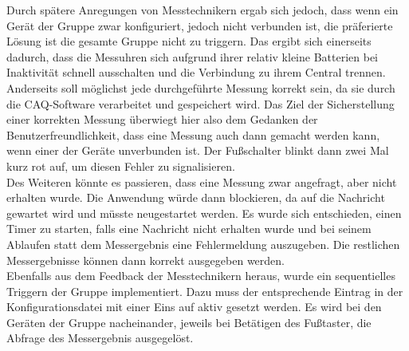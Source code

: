 Durch spätere Anregungen von Messtechnikern ergab sich jedoch, dass wenn ein Gerät der Gruppe zwar konfiguriert, jedoch nicht verbunden ist, die präferierte Lösung ist die gesamte Gruppe nicht zu triggern. Das ergibt sich einerseits dadurch, dass die Messuhren sich aufgrund ihrer relativ kleine Batterien bei Inaktivität schnell ausschalten und die Verbindung zu ihrem Central trennen. Anderseits soll möglichst jede durchgeführte Messung korrekt sein, da sie durch die \ac{CAQ}-Software verarbeitet und gespeichert wird. Das Ziel der Sicherstellung einer korrekten Messung überwiegt hier also dem Gedanken der Benutzerfreundlichkeit, dass eine Messung auch dann gemacht werden kann, wenn einer der Geräte unverbunden ist. Der Fußschalter blinkt dann zwei Mal kurz rot auf, um diesen Fehler zu signalisieren.\\
Des Weiteren könnte es passieren, dass eine Messung zwar angefragt, aber nicht erhalten wurde. Die Anwendung würde dann blockieren, da auf die Nachricht gewartet wird und müsste neugestartet werden. Es wurde sich entschieden, einen Timer zu starten, falls eine Nachricht nicht erhalten wurde und bei seinem Ablaufen statt dem Messergebnis eine Fehlermeldung auszugeben. Die restlichen Messergebnisse können dann korrekt ausgegeben werden.\\
Ebenfalls aus dem Feedback der Messtechnikern heraus, wurde ein sequentielles Triggern der Gruppe implementiert. Dazu muss der entsprechende Eintrag in der Konfigurationsdatei mit einer Eins auf aktiv gesetzt werden. Es wird bei den Geräten der Gruppe nacheinander, jeweils bei Betätigen des Fußtaster, die Abfrage des Messergebnis ausgegelöst.